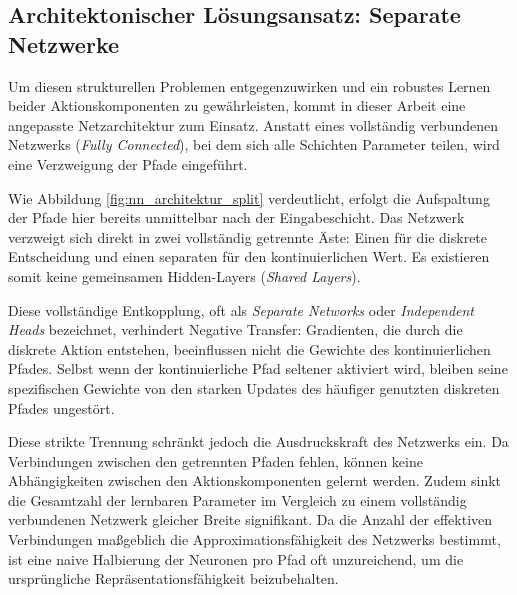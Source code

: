 \subsection*{Architektonischer Lösungsansatz: Separate Netzwerke}
Um diesen strukturellen Problemen entgegenzuwirken und ein robustes Lernen beider Aktionskomponenten zu gewährleisten, kommt in dieser Arbeit eine angepasste Netzarchitektur zum Einsatz. Anstatt eines vollständig verbundenen Netzwerks (\textit{Fully Connected}), bei dem sich alle Schichten Parameter teilen, wird eine Verzweigung der Pfade eingeführt. 
\medskip

Wie Abbildung \ref{fig:nn_architektur_split} verdeutlicht, erfolgt die Aufspaltung der Pfade hier bereits unmittelbar nach der Eingabeschicht. Das Netzwerk verzweigt sich direkt in zwei vollständig getrennte Äste: Einen für die diskrete Entscheidung und einen separaten für den kontinuierlichen Wert. Es existieren somit keine gemeinsamen Hidden\hyp{}Layers (\textit{Shared Layers}).
\medskip

Diese vollständige Entkopplung, oft als \textit{Separate Networks} oder \textit{Independent Heads} bezeichnet, verhindert Negative Transfer: Gradienten, die durch die diskrete Aktion entstehen, beeinflussen nicht die Gewichte des kontinuierlichen Pfades. Selbst wenn der kontinuierliche Pfad seltener aktiviert wird, bleiben seine spezifischen Gewichte von den starken Updates des häufiger genutzten diskreten Pfades ungestört.
\medskip

Diese strikte Trennung schränkt jedoch die Ausdruckskraft des Netzwerks ein. Da Verbindungen zwischen den getrennten Pfaden fehlen, können keine Abhängigkeiten zwischen den Aktionskomponenten gelernt werden. Zudem sinkt die Gesamtzahl der lernbaren Parameter im Vergleich zu einem vollständig verbundenen Netzwerk gleicher Breite signifikant. Da die Anzahl der effektiven Verbindungen maßgeblich die Approximationsfähigkeit des Netzwerks bestimmt, ist eine naive Halbierung der Neuronen pro Pfad oft unzureichend, um die ursprüngliche Repräsentationsfähigkeit beizubehalten.
\medskip


